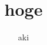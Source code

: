 \documentclass[dvipdfmx]{jsarticle}
\begin{document}
\title{hoge}
\author{aki}
\thispagestyle{empty}
\maketitle


\end{document}

